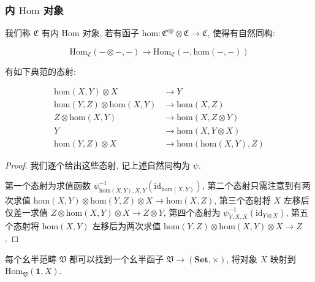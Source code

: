 \subsubsection{内 \(\mathrm{Hom}\) 对象}

\begin{definition}
    我们称 \(\mathfrak{C}\) 有内 \(\mathrm{Hom}\) 对象, 若有函子 \(\mathrm{hom} : \mathfrak{C}^\text{op} \otimes \mathfrak{C} \to \mathfrak{C}\), 使得有自然同构:

    \[
        \mathrm{Hom}_{\mathfrak{C}} (- \otimes - , -) \to \mathrm{Hom}_{\mathfrak{C}} (-, \mathrm{hom} (-,-))
    \]
\end{definition}

\begin{definition}
    \label {definition:internal hom canonical functor}
    有如下典范的态射:

    \[
        \begin{aligned}
            \mathrm{hom} (X,Y) \otimes X &\to Y \\
            \mathrm{hom} (Y,Z) \otimes \mathrm{hom} (X,Y) &\to \mathrm{hom} (X,Z) \\
            Z \otimes \mathrm{hom} (X,Y) &\to \mathrm{hom} (X,Z \otimes Y) \\
            Y &\to \mathrm{hom} (X,Y \otimes X) \\
            \mathrm{hom} (Y,Z) \otimes X &\to \mathrm{hom} (\mathrm{hom} (X,Y),Z)
        \end{aligned}
    \]

    \begin{proof}
        我们逐个给出这些态射, 记上述自然同构为 \(\psi\).

        第一个态射为求值函数 \(\psi_{\mathrm{hom}(X,Y),X,Y}^{-1} (\mathrm{id}_{\mathrm{hom} (X,Y)})\),
        第二个态射只需注意到有两次求值 \(\mathrm{hom} (X,Y) \otimes \mathrm{hom} (Y,Z) \otimes X \to \mathrm{hom} (X,Z)\),
        第三个态射将 \(X\) 左移后仅差一求值 \(Z \otimes \mathrm{hom} (X,Y) \otimes X \to Z \otimes Y\),
        第四个态射为 \(\psi_{Y,X,X}^{-1} (\mathrm{id}_{Y \otimes X})\),
        第五个态射将 \(\mathrm{hom} (X,Y)\) 左移后为两次求值 \(\mathrm{hom} (Y,Z) \otimes \mathrm{hom} (X,Y) \otimes X \to Z\).
    \end{proof}
\end{definition}

\begin{lemma}
    每个幺半范畴 \(\mathfrak{V}\) 都可以找到一个幺半函子 \(\mathfrak{V} \to (\mathbf{Set}, \times)\),
    将对象 \(X\) 映射到 \(\mathrm{Hom}_{\mathfrak{V}} (\mathbf{1}, X)\).
\end{lemma}

